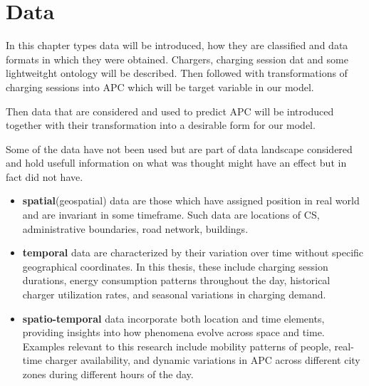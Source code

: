 \setchapterpreamble[u]{\margintoc}
\chapter{Data}
\label{ch:data}





In this chapter types data will be introduced, how they are classified and data formats in which they were obtained. Chargers, charging session dat and some lightweitght ontology will be described. Then followed with transformations of charging sessions into \acrlong{APC} which will be target variable in our model.

Then data that are considered and used to predict \acrlong{APC} will be introduced together with their transformation into a desirable form for our model.

Some of the data have not been used but are part of data landscape considered and hold usefull information on what was thought might have an effect but in fact did not have.


\begin{kaobox}[frametitle=Types of data]

    \begin{itemize}
        \item \textbf{spatial}(geospatial) data are those which have assigned position in real world and are invariant in some timeframe. Such data are locations of \acrlong{CS}, administrative boundaries, road network, buildings.
        \item \textbf{temporal} data are characterized by their variation over time without specific geographical coordinates. In this thesis, these include charging session durations, energy consumption patterns throughout the day, historical charger utilization rates, and seasonal variations in charging demand.
        \item \textbf{spatio-temporal} data incorporate both location and time elements, providing insights into how phenomena evolve across space and time. Examples relevant to this research include mobility patterns of people, real-time charger availability, and dynamic variations in \acrshort{APC} across different city zones during different hours of the day.
    \end{itemize}
\end{kaobox}

